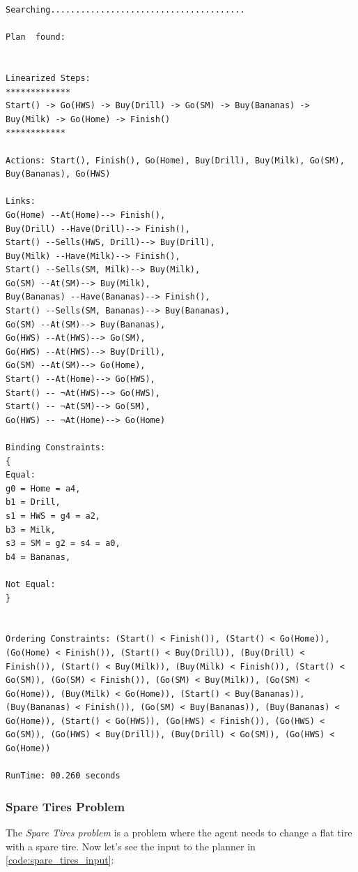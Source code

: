 \begin{lstlisting}[frame=single, basicstyle=\small\ttfamily, breaklines=true, captionpos=b, caption={Milk, Bananas, and Cordless Drill Problem Output of the Planner}, label={code:milk_bananas_cordless_drill_output}]
    Searching.......................................

Plan  found: 


Linearized Steps:
*************
Start() -> Go(HWS) -> Buy(Drill) -> Go(SM) -> Buy(Bananas) -> Buy(Milk) -> Go(Home) -> Finish()
************

Actions: Start(), Finish(), Go(Home), Buy(Drill), Buy(Milk), Go(SM), Buy(Bananas), Go(HWS)

Links: 
Go(Home) --At(Home)--> Finish(), 
Buy(Drill) --Have(Drill)--> Finish(), 
Start() --Sells(HWS, Drill)--> Buy(Drill), 
Buy(Milk) --Have(Milk)--> Finish(), 
Start() --Sells(SM, Milk)--> Buy(Milk), 
Go(SM) --At(SM)--> Buy(Milk), 
Buy(Bananas) --Have(Bananas)--> Finish(), 
Start() --Sells(SM, Bananas)--> Buy(Bananas), 
Go(SM) --At(SM)--> Buy(Bananas), 
Go(HWS) --At(HWS)--> Go(SM), 
Go(HWS) --At(HWS)--> Buy(Drill), 
Go(SM) --At(SM)--> Go(Home), 
Start() --At(Home)--> Go(HWS), 
Start() -- ¬At(HWS)--> Go(HWS), 
Start() -- ¬At(SM)--> Go(SM), 
Go(HWS) -- ¬At(Home)--> Go(Home)

Binding Constraints: 
{
Equal:
g0 = Home = a4,
b1 = Drill,
s1 = HWS = g4 = a2,
b3 = Milk,
s3 = SM = g2 = s4 = a0,
b4 = Bananas,

Not Equal:
}


Ordering Constraints: (Start() < Finish()), (Start() < Go(Home)), (Go(Home) < Finish()), (Start() < Buy(Drill)), (Buy(Drill) < Finish()), (Start() < Buy(Milk)), (Buy(Milk) < Finish()), (Start() < Go(SM)), (Go(SM) < Finish()), (Go(SM) < Buy(Milk)), (Go(SM) < Go(Home)), (Buy(Milk) < Go(Home)), (Start() < Buy(Bananas)), (Buy(Bananas) < Finish()), (Go(SM) < Buy(Bananas)), (Buy(Bananas) < Go(Home)), (Start() < Go(HWS)), (Go(HWS) < Finish()), (Go(HWS) < Go(SM)), (Go(HWS) < Buy(Drill)), (Buy(Drill) < Go(SM)), (Go(HWS) < Go(Home))

RunTime: 00.260 seconds
\end{lstlisting}

\subsubsection{Spare Tires Problem} \label{subsubsec:spare_tires_output}
The \textit{Spare Tires problem} is a problem where the agent needs to change a flat tire with a spare tire. Now let's see the input to the planner in \autoref{code:spare_tires_input}:

